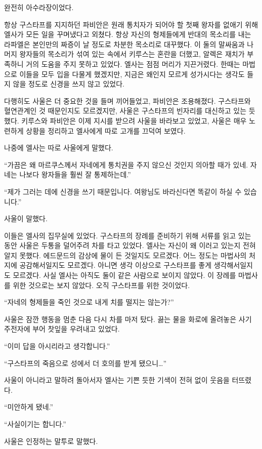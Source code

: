 완전히 아수라장이었다.

항상 구스타프를 지지하던 파비안은 원래 통치자가 되어야 할 첫째 왕자를 없애기 위해 엘사가 모든 일을 꾸며냈다고 외쳤다. 항상 자신의 형제들에게 반대의 목소리를 내는 라파엘은 본인만의 짜증이 날 정도로 차분한 목소리로 대꾸했다. 이 둘의 말싸움과 나머지 왕자들의 목소리가 섞여 있는 속에서 키루스는 혼란을 더했고, 알렉은 재치가 부족하니 거의 도움을 주지 못하고 있었다. 엘사는 점점 머리가 지끈거렸다. 한때는 마법으로 이들을 모두 입을 다물게 했겠지만, 지금은 왜인지 모르게 성가시다는 생각도 들지 않을 정도로 신경을 쓰지 않고 있었다.

다행히도 사울은 더 중요한 것을 들며 끼어들었고, 파비안은 조용해졌다. 구스타프와 혈연관계인 것 때문인지도 모르겠지만, 사울은 구스타프의 빈자리를 대신하고 있는 듯했다. 키루스와 파비안은 이제 지시를 받으려 사울을 바라보고 있었고,  사울은 매우 노련하게 상황을 정리하고 엘사에게 따로 고개를 끄덕여 보였다.

나중에 엘사는 따로 사울에게 말했다.

``가끔은 왜 마르쿠스께서 자네에게 통치권을 주지 않으신 것인지 의아할 때가 있네. 자네는 나보다 왕자들을 훨씬 잘 통제하는데.''

``제가 그러는 데에 신경을 쓰기 때문입니다. 여왕님도 바라신다면 똑같이 하실 수 있습니다.''

사울이 말했다.

이들은 엘사의 집무실에 있었다. 구스타프의 장례를 준비하기 위해 서류를 읽고 있는 동안 사울은 두통을 덜어주려 차를 타고 있었다. 엘사는 자신이 왜 이러고 있는지 전혀 알지 못했다. 에드문드의 감상에 물이 든 것일지도 모르겠다. 어느 정도는 마법사의 처지에 공감해서일지도 모르겠다. 아니면 생각 이상으로 구스타프를 좋게 생각해서일지도 모르겠다. 사실 엘사는 아직도 둘이 같은 사람으로 보이지 않았다. 이 장례를 마법사를 위한 것으로는 보지 않았다. 오직 구스타프를 위한 것이었다.

``자네의 형제들을 죽인 것으로 내게 치를 떨지는 않는가?''

사울은 잠깐 행동을 멈춘 다음 다시 차를 마저 탔다. 끓는 물을 화로에 올려놓은 사기 주전자에 부어 찻잎을 우려내고 있었다.

``이미 답을 아시리라고 생각합니다.''

``구스타프의 죽음으로 성에서 더 호의를 받게 됐으니\ldots''

사울이 아니라고 말하려 돌아서자 엘사는 기쁜 듯한 기색이 전혀 없이 웃음을 터뜨렸다.

``미안하게 됐네.''

``사실이기는 합니다.''

사울은 인정하는 말투로 말했다.

